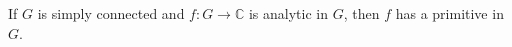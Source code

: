 If $G$ is simply connected and $f: G \rightarrow \mathbb{C}$ is analytic in $G$, then $f$ has a primitive in $G$.
